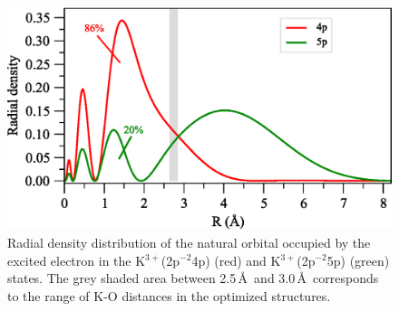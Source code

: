 \documentclass[journal=jacsat,manuscript=suppinfo]{achemso}
\begin{document}
\begin{figure}
\centering
\includegraphics[scale=1.0]{figures/k_2p4_4p5p_rad_dens.eps}
\caption{Radial density distribution of the natural orbital occupied by the excited electron in the K$^{3+}$(2p$^{-2}$4p) (red) and K$^{3+}$(2p$^{-2}$5p) (green) states. The grey shaded area between 2.5\,\AA~and 3.0\,\AA~corresponds to the range of K-O distances {\color{red}in the optimized structures}.}
\label{fg:k_2p4nl_raddens}
\end{figure}


%
\end{document}
